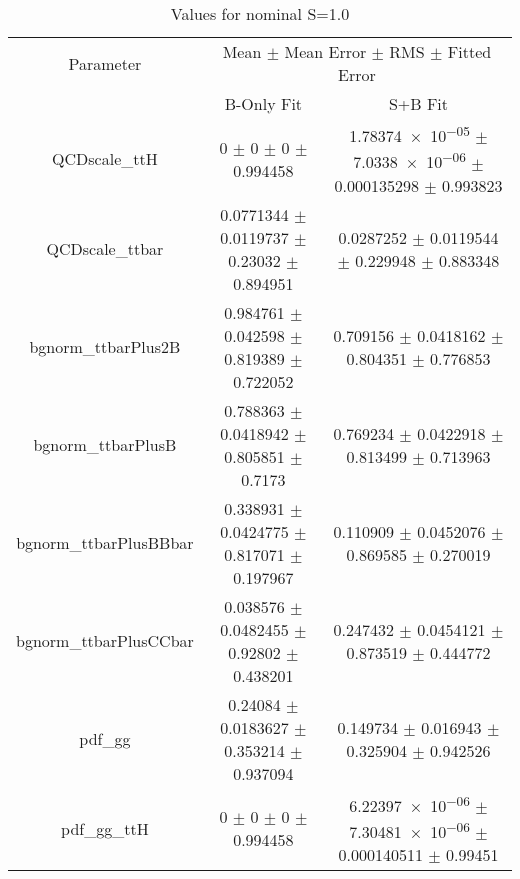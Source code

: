 \begin{table}
\centering
\caption{Values for nominal S=1.0}
\begin{tabular}{ccc}
\toprule
Parameter & \multicolumn{2}{c}{Mean $\pm$ Mean Error $\pm$ RMS $\pm$ Fitted Error}\\
 & B-Only Fit & S+B Fit\\
\midrule
QCDscale\_ttH & \num{0} $\pm$ \num{0} $\pm$ \num{0} $\pm$ \num{0.994458} & \num{1.78374e-05} $\pm$ \num{7.0338e-06} $\pm$ \num{0.000135298} $\pm$ \num{0.993823}\\
QCDscale\_ttbar & \num{0.0771344} $\pm$ \num{0.0119737} $\pm$ \num{0.23032} $\pm$ \num{0.894951} & \num{0.0287252} $\pm$ \num{0.0119544} $\pm$ \num{0.229948} $\pm$ \num{0.883348}\\
bgnorm\_ttbarPlus2B & \num{0.984761} $\pm$ \num{0.042598} $\pm$ \num{0.819389} $\pm$ \num{0.722052} & \num{0.709156} $\pm$ \num{0.0418162} $\pm$ \num{0.804351} $\pm$ \num{0.776853}\\
bgnorm\_ttbarPlusB & \num{0.788363} $\pm$ \num{0.0418942} $\pm$ \num{0.805851} $\pm$ \num{0.7173} & \num{0.769234} $\pm$ \num{0.0422918} $\pm$ \num{0.813499} $\pm$ \num{0.713963}\\
bgnorm\_ttbarPlusBBbar & \num{0.338931} $\pm$ \num{0.0424775} $\pm$ \num{0.817071} $\pm$ \num{0.197967} & \num{0.110909} $\pm$ \num{0.0452076} $\pm$ \num{0.869585} $\pm$ \num{0.270019}\\
bgnorm\_ttbarPlusCCbar & \num{0.038576} $\pm$ \num{0.0482455} $\pm$ \num{0.92802} $\pm$ \num{0.438201} & \num{0.247432} $\pm$ \num{0.0454121} $\pm$ \num{0.873519} $\pm$ \num{0.444772}\\
pdf\_gg & \num{0.24084} $\pm$ \num{0.0183627} $\pm$ \num{0.353214} $\pm$ \num{0.937094} & \num{0.149734} $\pm$ \num{0.016943} $\pm$ \num{0.325904} $\pm$ \num{0.942526}\\
pdf\_gg\_ttH & \num{0} $\pm$ \num{0} $\pm$ \num{0} $\pm$ \num{0.994458} & \num{6.22397e-06} $\pm$ \num{7.30481e-06} $\pm$ \num{0.000140511} $\pm$ \num{0.99451}\\
\bottomrule
\end{tabular}
\end{table}